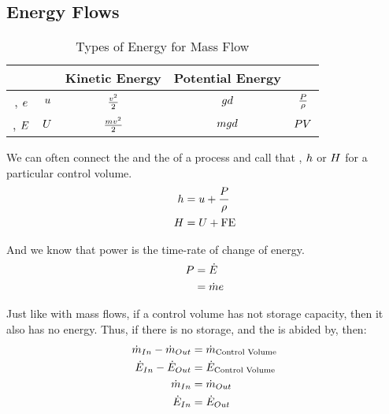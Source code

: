 \subsection{Energy Flows}\label{subsec:Energy_Flows}
\begin{table}[h!tbp]
  \centering
  \begin{tabular}{ccccc}
    \toprule
    & \nameref{def:Internal_Energy} & Kinetic Energy & Potential Energy & \nameref{def:Flow_Energy} \\
    \midrule
    \nameref{def:Specific_Energy}, $e$ & $u$ & $\frac{v^{2}}{2}$ & $g d$ & $\frac{P}{\rho}$ \\
    \nameref{def:Energy}, $E$ & $U$ & $\frac{m v^{2}}{2}$ & $m g d$ & $P V$ \\
    \bottomrule
  \end{tabular}
  \caption{Types of Energy for Mass Flow}
  \label{tab:Energy_Flows}
\end{table}

We can often connect the  and the  of a process and call that , $h$ or $H$ for a particular control volume.
\begin{align*}
  h &= u + \frac{P}{\rho} \\
  H &= U + \mathrm{FE}
\end{align*}

And we know that power is the time-rate of change of energy.
\begin{align*}
  P &= \dot{E} \\
  &= \dot{m} e
\end{align*}

Just like with mass flows, if a control volume has not storage capacity, then it also has no energy.
Thus, if there is no storage, and the  is abided by, then:
\begin{align*}
  \dot{m}_{In} - \dot{m}_{Out} &= \dot{m}_{\text{Control Volume}} \\
  \dot{E}_{In} - \dot{E}_{Out} &= \dot{E}_{\text{Control Volume}} \\
  \dot{m}_{In} &= \dot{m}_{Out} \\
  \dot{E}_{In} &= \dot{E}_{Out}
\end{align*}

